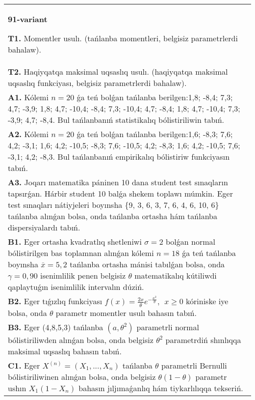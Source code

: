 \documentclass{article}
\begin{document}
\begin{tabular}{m{17cm}}
\end{tabular}
\vspace{1cm}


\begin{tabular}{m{17cm}}
\textbf{91-variant}
\newline

\textbf{T1.} 
Momentler usulı. (tańlanba momentleri, belgisiz parametrlerdi bahalaw).
 \\
\textbf{T2.} 
Haqiyqatqa maksimal uqsaslıq usulı. (haqiyqatqa maksimal uqsaslıq funkciyası, belgisiz parametrlerdi bahalaw).
 \\
\textbf{A1.} 
Kólemi \(n = 20\) ǵa teń bolǵan tańlanba berilgen:1,8; -8,4; 7,3; 4,7; -3,9; 1,8; 4,7; -10,4; -8,4; 7,3; -10,4; 4,7; -8,4; 1,8; 4,7; -10,4; 7,3; -3,9; 4,7; -8,4. Bul tańlanbanıń statistikalıq bólistiriliwin tabıń.
 \\
\textbf{A2.} 
Kólemi \(n = 20\) ǵa teń bolǵan tańlanba berilgen:1,6; -8,3; 7,6; 4,2; -3,1; 1,6; 4,2; -10,5; -8,3; 7,6; -10,5; 4,2; -8,3; 1,6; 4,2; -10,5; 7,6; -3,1; 4,2; -8,3. Bul tańlanbanıń empirikalıq bólistiriw funkciyasın tabıń.
 \\
\textbf{A3.} 
Joqarı matematika páninen 10 dana student test sınaqların tapsırǵan. Hárbir student 10 balǵa shekem toplawı múmkin. Eger test sınaqları nátiyjeleri boyınsha \{9, 3, 6, 3, 7, 6, 4, 6, 10, 6\} tańlanba alınǵan bolsa, onda tańlanba ortasha hám tańlanba dispersiyalardı tabıń.
 \\
\textbf{B1.} 
Eger ortasha kvadratlıq shetleniwi \(\sigma = 2\) bolǵan normal bólistirilgen bas toplamnan alınǵan kólemi \(n = 18\) ǵa teń tańlanba boyınsha \(\overline{x} = 5,2\) tańlanba ortasha mánisi tabılǵan bolsa, onda \(\gamma = 0,90\) isenimlilik penen belgisiz \(\theta\) matematikalıq kútiliwdi qaplaytuǵın isenimlilik intervalın dúziń.
 \\
\textbf{B2.} 
Eger tıǵızlıq funkciyası \(f(x) = \frac{2x}{\theta}e^{- \frac{x^{2}}{\theta}},\ \ x \geq 0\) kóriniske iye bolsa, onda \(\theta\) parametr momentler usulı bahasın tabıń.
 \\
\textbf{B3.} 
Eger (4,8,5,3) tańlanba \(\left( a,\theta^{2} \right)\) parametrli normal bólistiriliwden alınǵan bolsa, onda belgisiz \(\theta^{2}\) parametrdiń shınlıqqa maksimal uqsaslıq bahasın tabıń.
 \\
\textbf{C1.} 
Eger \(X^{(n)} = \left( X_{1},...,X_{n} \right)\) tańlanba \(\theta\) parametrli Bernulli bólistiriliwinen alınǵan bolsa, onda belgisiz \(\theta(1 - \theta)\) parametr ushın \(X_{1}\left( 1 - X_{n} \right)\) bahasın jıljımaǵanlıq hám tiykarlılıqqa tekseriń.

\end{tabular}
\end{document}
